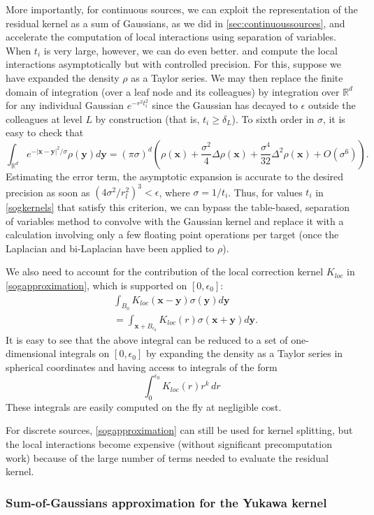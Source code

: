 \documentclass[final,letterpaper]{siamart171218}
\newcommand{\be}{\begin{equation}}
\newcommand{\ee}{\end{equation}}
\newcommand{\ba}{\begin{aligned}}
\newcommand{\ea}{\end{aligned}}
\newcommand{\x}{\boldsymbol{x}}
\newcommand{\y}{\boldsymbol{y}}
\newcommand{\cR}{r}
\begin{document}
More importantly, for continuous sources, 
we can exploit the representation of the residual kernel 
as a sum of Gaussians, as we did in \cref{sec:continuoussources}, and accelerate
the computation of local interactions using separation of variables.
When $t_i$ is very large, however, we can do even better.
and compute the local interactions asymptotically but with controlled precision.
For this, suppose we have expanded the density $\rho$ as a Taylor
series. We may then replace the finite domain of integration 
(over a leaf node and its colleagues)
by integration over $\mathbb{R}^d$ for any
individual Gaussian $e^{-r^2t^2_i}$ since the Gaussian has decayed
to $\epsilon$ outside the colleagues at level $L$ by construction (that is,
$t_i \geq \delta_L$).
To sixth order in $\sigma$, it is easy to check that
\be
\int_{\mathbb{R}^d}e^{-|\x-\y|^2/\sigma}\rho(\y)d\y =(\pi \sigma)^{d}
\left(\rho(\x) + \frac{\sigma^2}{4}\Delta \rho(\x) + \frac{\sigma^4}{32} \Delta^2 \rho(\x)
+ O(\sigma^6)\right).
\ee
Estimating the error term,
the asymptotic expansion is accurate to the desired precision as soon as 
$\left(4\sigma^2/\cR_l^2\right)^3 < \epsilon$, where $\sigma=1/t_i$.
Thus, for values $t_i$ in \eqref{sogkernels} that satisfy this criterion, we can bypass
the table-based, separation of variables method to convolve with the Gaussian kernel
and replace it with a calculation
involving only a few floating point operations per target (once the Laplacian and bi-Laplacian have
been applied to $\rho$).

We also need to account for the contribution of the local correction kernel $K_{loc}$ in 
\cref{sogapproximation}, which is supported
on $[0,\epsilon_0]$:
\be
\ba
&\int_{B_0} K_{loc}(\x-\y) \sigma(\y)d\y  \\
&= \int_{\x+B_{\epsilon_0}} K_{loc}(r) \sigma(\x+\y)d\y.
\ea
\ee
It is easy to see that the above integral can be reduced to a set of one-dimensional integrals
on $[0,\epsilon_0]$ by expanding the density as a Taylor series in spherical coordinates
and having access to integrals of the form
\be
\int_0^{\epsilon_0} K_{loc}(r) r^{k} \, dr
\ee
These integrals are easily computed on the fly at negligible cost.

For discrete sources, \cref{sogapproximation} can still be used for kernel splitting,
but the local interactions become expensive (without significant precomputation work)
because of the large number of terms needed to evaluate the residual kernel.

\subsubsection{Sum-of-Gaussians approximation for the Yukawa kernel}
\end{document}
